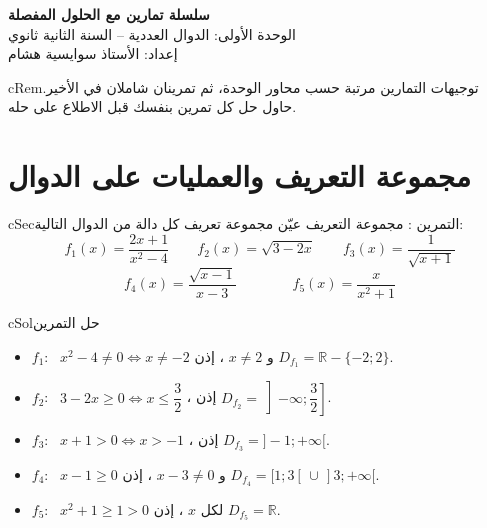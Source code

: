 \documentclass[12pt,a4paper]{article}
\newenvironment{BOX}[2]{\begin{otherlanguage}{english}\begin{arbox}{#1}{#2}}{\end{arbox}\end{otherlanguage}}
\newenvironment{molahada}[1][ملاحظة]{\begin{BOX}{cRem}{#1}}{\end{BOX}}
\newcounter{exo}
\newenvironment{tamrin}[1]{\stepcounter{exo}\begin{BOX}{cSec}{التمرين \theexo: #1}}{\end{BOX}}
\newenvironment{hal}{\Needspace{12\baselineskip}\begin{otherlanguage}{english}\begin{arbox}[breakable]{cSol}{حل التمرين \theexo}}{\end{arbox}\end{otherlanguage}}
\newenvironment{LTR}{\begin{otherlanguage}{english}}{\end{otherlanguage}}
\newcommand{\R}{\mathbb{R}}
\begin{document}
\begin{LTR}
\begin{tcolorbox}[enhanced,colback=cSec,colframe=cSec,arc=3mm,halign=center,
  boxrule=0pt,top=10pt,bottom=10pt,before upper={\selectlanguage{arabic}}]
{\color{white}\Huge\bfseries سلسلة تمارين مع الحلول المفصلة}\\[6pt]
{\color{white}\large الوحدة الأولى: الدوال العددية -- السنة الثانية ثانوي}\\[4pt]
{\color{white!85!cSec}\normalsize إعداد: الأستاذ سوايسية هشام}
\end{tcolorbox}
\end{LTR}

\begin{molahada}[توجيهات]
التمارين مرتبة حسب محاور الوحدة، ثم تمرينان شاملان في الأخير. حاول حل كل تمرين بنفسك قبل الاطلاع على حله.
\end{molahada}

\section{مجموعة التعريف والعمليات على الدوال}
\begin{tamrin}{مجموعة التعريف}
عيّن مجموعة تعريف كل دالة من الدوال التالية:
\[f_1(x)=\frac{2x+1}{x^2-4}\qquad f_2(x)=\sqrt{3-2x}\qquad f_3(x)=\frac{1}{\sqrt{x+1}}\]
\[f_4(x)=\frac{\sqrt{x-1}}{x-3}\qquad\qquad f_5(x)=\frac{x}{x^2+1}\]
\end{tamrin}
\begin{hal}
\begin{itemize}
\item $f_1$: \ $x^2-4\ne0\iff x\ne-2$ و $x\ne2$ ، إذن $\boxed{D_{f_1}=\R-\{-2;2\}}$.
\item $f_2$: \ $3-2x\ge0\iff x\le\dfrac32$ ، إذن $\boxed{D_{f_2}=\left]-\infty;\dfrac32\right]}$.
\item $f_3$: \ $x+1>0\iff x>-1$ ، إذن $\boxed{D_{f_3}=]-1;+\infty[}$.
\item $f_4$: \ $x-1\ge0$ و $x-3\ne0$ ، إذن $\boxed{D_{f_4}=[1;3[\,\cup\,]3;+\infty[}$.
\item $f_5$: \ $x^2+1\ge1>0$ لكل $x$ ، إذن $\boxed{D_{f_5}=\R}$.
\end{itemize}
\end{hal}
\end{document}
